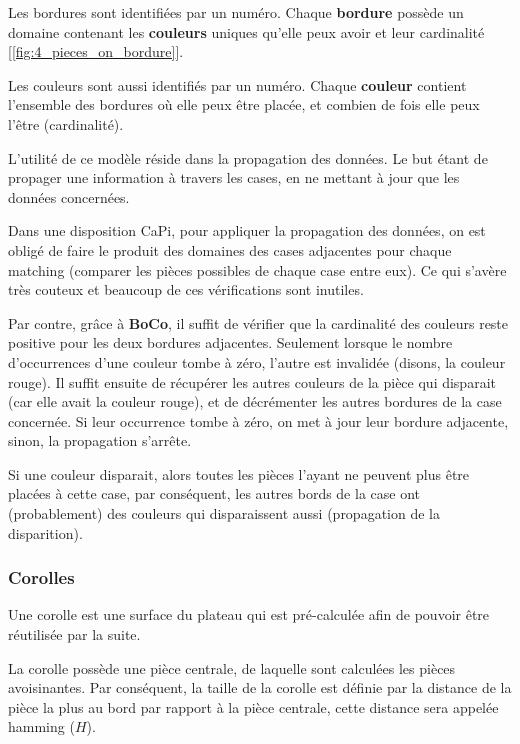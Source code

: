 	Les bordures sont identifiées par un numéro. Chaque \textbf{bordure} possède un domaine contenant les \textbf{couleurs} uniques qu'elle peux avoir et leur cardinalité [\autoref{fig:4_pieces_on_bordure}].
	
	Les couleurs sont aussi identifiés par un numéro. Chaque \textbf{couleur} contient l'ensemble des bordures où elle peux être placée, et combien de fois elle peux l'être (cardinalité).
	
	L'utilité de ce modèle réside dans la propagation des données. Le but étant de propager une information à travers les cases, en ne mettant à jour que les données concernées.
	
	Dans une disposition CaPi, pour appliquer la propagation des données, on est obligé de faire le produit des domaines des cases adjacentes pour chaque matching (comparer les pièces possibles de chaque case entre eux). Ce qui s'avère très couteux et beaucoup de ces vérifications sont inutiles.
	
	Par contre, grâce à \textbf{BoCo}, il suffit de vérifier que la cardinalité des couleurs reste positive pour les deux bordures adjacentes. Seulement lorsque le nombre d'occurrences d'une couleur tombe à zéro, l'autre est invalidée (disons, la couleur rouge). Il suffit ensuite de récupérer les autres couleurs de la pièce qui disparait (car elle avait la couleur rouge), et de décrémenter les autres bordures de la case concernée. Si leur occurrence tombe à zéro, on met à jour leur bordure adjacente, sinon, la propagation s'arrête.

	\begin{exmp}
		Si une couleur disparait, alors toutes les pièces l'ayant ne peuvent plus être placées à cette case, par conséquent, les autres bords de la case ont (probablement) des couleurs qui disparaissent aussi (propagation de la disparition).
	\end{exmp}

	\subsubsection{Corolles}


	Une corolle est une surface du plateau qui est pré-calculée afin de pouvoir être réutilisée par la suite.
		
	La corolle possède une pièce centrale, de laquelle sont calculées les pièces avoisinantes. Par conséquent, la taille de la corolle est définie par la distance de la pièce la plus au bord par rapport à la pièce centrale, cette distance sera appelée hamming ($H$).
	
